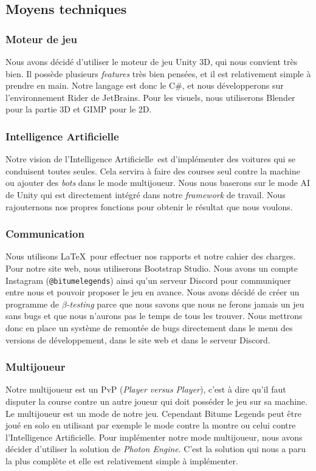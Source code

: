 \documentclass[12pt,a4paper]{article}
\newcommand{\AI}{Intelligence Artificielle}
\begin{document}
\subsection{Moyens techniques}
\subsubsection{Moteur de jeu}
Nous avons décidé d'utiliser le moteur de jeu Unity 3D, qui nous convient très bien. Il possède plusieurs 
\textit{features} très bien pensées, et il est relativement simple à prendre en main. Notre langage est 
donc le C\#, et nous développerons sur l'environnement Rider de JetBrains. Pour les visuels, nous
utiliserons Blender pour la partie 3D et GIMP pour le 2D.
\subsubsection{\AI}
Notre vision de l'\AI\, est d'implémenter des voitures qui se conduisent toutes seules.
Cela servira à faire des courses seul contre la machine ou ajouter des \textit{bots} dans le mode 
multijoueur. Nous nous baserons sur le mode AI de Unity qui est directement intégré
dans notre \textit{framework} de travail. Nous rajouternons nos propres fonctions pour obtenir
le résultat que nous voulons.
\subsubsection{Communication}
Nous utilisons \LaTeX\, pour effectuer nos rapports et notre cahier des charges. Pour notre site web, 
nous utiliserons Bootstrap Studio. Nous avons un compte Instagram (\texttt{@bitumelegends}) 
ainsi qu'un serveur Discord pour communiquer entre nous et pouvoir proposer le jeu en avance.
Nous avons décidé de créer un programme de \(\beta\)\textit{-testing} parce que nous savons que nous 
ne ferons jamais un jeu sans bugs et que nous n'aurons pas le temps de tous les trouver. Nous mettrons
donc en place un système de remontée de bugs directement dans le menu des versions de développement, 
dans le site web et dans le serveur Discord.
\subsubsection{Multijoueur}
Notre multijoueur est un PvP (\textit{Player versus Player}), c'est à dire qu'il faut disputer la course 
contre un autre joueur qui doit posséder le jeu sur sa machine. Le multijoueur est un mode de notre jeu. 
Cependant Bitume Legends peut être joué en solo en utilisant par exemple le mode contre la montre ou 
celui contre l'Intelligence Artificielle. Pour implémenter notre mode multijoueur, nous avons décider 
d'utiliser la solution de \emph{Photon Engine}. C'est la solution qui nous a paru la plus complète et 
elle est relativement simple à implémenter.
\end{document}
